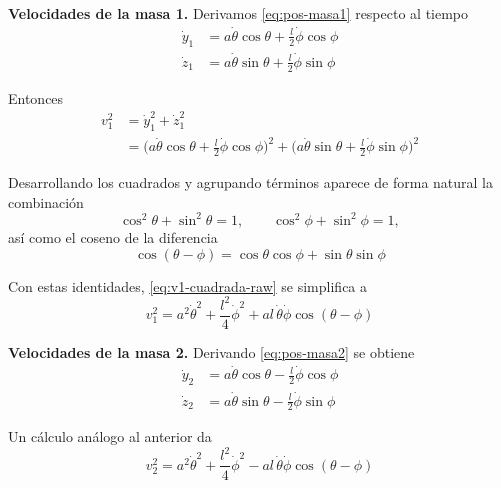 \documentclass{article}
\begin{document}
\medskip
\textbf{Velocidades de la masa 1.} Derivamos \eqref{eq:pos-masa1} respecto al
tiempo
\begin{equation}
\begin{split}
\dot y_{1} &= a\dot\theta\cos\theta
           + \frac{l}{2}\dot\phi\cos\phi \\[4pt]
\dot z_{1} &= a\dot\theta\sin\theta
           + \frac{l}{2}\dot\phi\sin\phi
\end{split}
\label{eq:vel-masa1}
\end{equation}

Entonces
\begin{equation}
\begin{split}
v_{1}^{2}
&= \dot y_{1}^{2} + \dot z_{1}^{2} \\[4pt]
&=
\bigl(a\dot\theta\cos\theta + \tfrac{l}{2}\dot\phi\cos\phi\bigr)^{2}
+
\bigl(a\dot\theta\sin\theta + \tfrac{l}{2}\dot\phi\sin\phi\bigr)^{2}
\end{split}
\label{eq:v1-cuadrada-raw}
\end{equation}

Desarrollando los cuadrados y agrupando términos aparece de forma natural la
combinación
\[
\cos^{2}\theta + \sin^{2}\theta = 1,
\qquad
\cos^{2}\phi + \sin^{2}\phi = 1,
\]
así como el coseno de la diferencia
\[
\cos(\theta-\phi)
= \cos\theta\cos\phi + \sin\theta\sin\phi
\]

Con estas identidades, \eqref{eq:v1-cuadrada-raw} se simplifica a
\begin{equation}
v_{1}^{2}
= a^{2}\dot\theta^{2}
+ \frac{l^{2}}{4}\dot\phi^{2}
+ a l\,\dot\theta\dot\phi\cos(\theta-\phi)
\label{eq:v1-cuadrada}
\end{equation}

\medskip
\textbf{Velocidades de la masa 2.} Derivando \eqref{eq:pos-masa2} se obtiene
\begin{equation}
\begin{split}
\dot y_{2} &= a\dot\theta\cos\theta
           - \frac{l}{2}\dot\phi\cos\phi \\[4pt]
\dot z_{2} &= a\dot\theta\sin\theta
           - \frac{l}{2}\dot\phi\sin\phi
\end{split}
\label{eq:vel-masa2}
\end{equation}

Un cálculo análogo al anterior da
\begin{equation}
v_{2}^{2}
= a^{2}\dot\theta^{2}
+ \frac{l^{2}}{4}\dot\phi^{2}
- a l\,\dot\theta\dot\phi\cos(\theta-\phi)
\label{eq:v2-cuadrada}
\end{equation}
\end{document}
